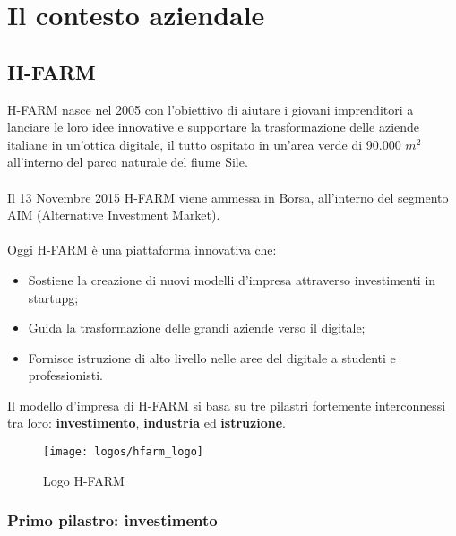 
\chapter{Il contesto aziendale}
\label{cap:contesto-aziendale}

\section{H-FARM}

H-FARM nasce nel 2005 con l'obiettivo di aiutare i giovani imprenditori a lanciare le loro idee innovative e supportare la trasformazione delle aziende italiane in un'ottica digitale, il tutto ospitato in un'area verde di 90.000 $ m^2 $ all'interno del parco naturale del fiume Sile.
\\ \\ 
Il 13 Novembre 2015 H-FARM viene ammessa in Borsa, all'interno del segmento AIM (Alternative Investment Market).
\\ \\
Oggi H-FARM è una piattaforma innovativa che:
\begin{itemize}
	\item Sostiene la creazione di nuovi modelli d'impresa attraverso investimenti in \gls{startupg}\glsfirstoccur;
	\item Guida la trasformazione delle grandi aziende verso il digitale;
	\item Fornisce istruzione di alto livello nelle aree del digitale a studenti e professionisti.
\end{itemize}

Il modello d'impresa di H-FARM si basa su tre pilastri fortemente interconnessi tra loro: \textbf{investimento}, \textbf{industria} ed \textbf{istruzione}.

\begin{figure}[htbp]
\begin{center}
\texttt{[image: logos/hfarm\_logo]}
\caption{Logo H-FARM}
\end{center}
\end{figure}

\subsection{Primo pilastro: investimento}

